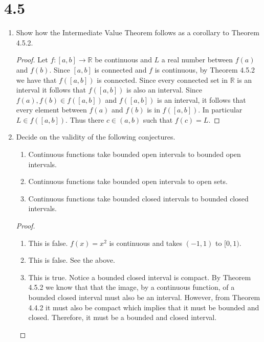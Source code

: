 \section*{4.5}
\begin{enumerate}
    \item Show how the Intermediate Value Theorem follows as a corollary to Theorem 4.5.2.
    
    \begin{proof}
    Let \( f:[a,b] \rightarrow \mathbb{R} \) be continuous and \( L \) a real number between \( f(a) \) and \( f(b) \). Since \( [a,b] \) is connected and \( f \) is continuous, by Theorem 4.5.2 we have that \( f([a,b]) \) is connected. Since every connected set in \( \mathbb{R} \) is an interval it follows that \( f([a,b]) \) is also an interval. Since \( f(a), f(b) \in f([a,b]) \) and \( f([a,b]) \) is an interval, it follows that every element between \( f(a) \) and \( f(b) \) is in \( f([a,b]) \). In particular \( L \in f([a,b]) \). Thus there \( c \in (a,b) \) such that \( f(c) = L \).  
    \end{proof}
    
    \item Decide on the validity of the following conjectures.
    \begin{enumerate}
        \item Continuous functions take bounded open intervals to bounded open intervals.
        \item Continuous functions take bounded open intervals to open sets.
        \item Continuous functions take bounded closed intervals to bounded closed intervals.
    \end{enumerate}
    \begin{proof}
    \begin{enumerate}
        \item This is false. \( f(x) = x^{2} \) is continuous and takes \( (-1,1) \) to \( [0,1) \).
        \item This is false. See the above.
        \item This is true. Notice a bounded closed interval is compact. By Theorem 4.5.2 we know that that the image, by a continuous function, of a bounded closed interval must also be an interval. However, from Theorem 4.4.2 it must also be compact which implies that it must be bounded and closed. Therefore, it must be a bounded and closed interval. 
    \end{enumerate}
    \end{proof}
    

\end{enumerate}
